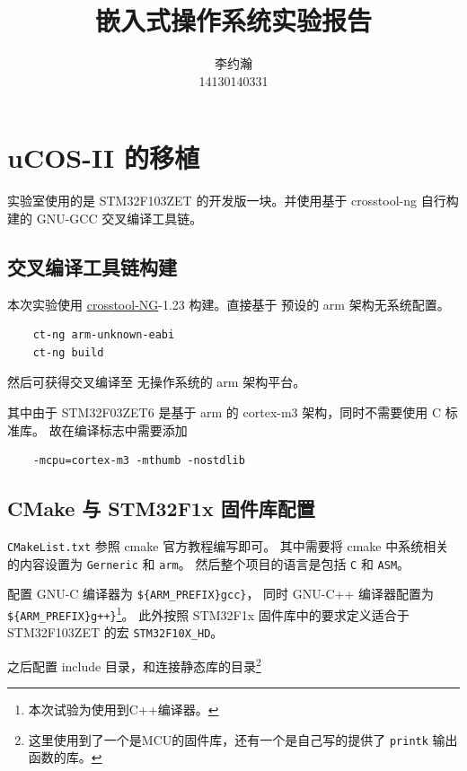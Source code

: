 \documentclass{ctexart}
\title{嵌入式操作系统实验报告}
\author{李约瀚 \\ 14130140331}
\begin{document}
    \maketitle
    \newpage
    \tableofcontents
    \newpage
    
    \section{uCOS-II 的移植}
    \label{sec:ucosii-transplate}
    
    实验室使用的是 STM32F103ZET 的开发版一块。并使用基于 crosstool-ng 自行构建的 GNU-GCC
    交叉编译工具链。
    
    \subsection{交叉编译工具链构建}
    \label{sec:ucosii-transplate:crosstool-chain}
    
    本次实验使用 \href{http://crosstool-ng.github.io/}{crosstool-NG}-1.23 构建。直接基于
    预设的 arm 架构无系统配置。
    \begin{lstlisting}
    ct-ng arm-unknown-eabi
    ct-ng build
    \end{lstlisting}
    然后可获得交叉编译至 无操作系统的 arm 架构平台。
    
    其中由于 STM32F03ZET6 是基于 arm 的 cortex-m3 架构，同时不需要使用 C 标准库。
    故在编译标志中需要添加
    \begin{lstlisting}
    -mcpu=cortex-m3 -mthumb -nostdlib
    \end{lstlisting}
    
    \subsection{CMake 与 STM32F1x 固件库配置}
    \label{sec:ucosii-transplate:cmakeNstm32f1x}
    
    \lstinline|CMakeList.txt| 参照 cmake 官方教程编写即可。
    其中需要将 cmake 中系统相关的内容设置为 \verb|Gerneric| 和 \verb|arm|。
    然后整个项目的语言是包括 \verb|C| 和 \verb|ASM|。
    
    配置 GNU-C 编译器为 \lstinline|${ARM_PREFIX}gcc}|， 同时 GNU-C++ 编译器配置为 
    \lstinline|${ARM_PREFIX}g++}|\footnote{本次试验为使用到C++编译器。}。
    此外按照 STM32F1x 固件库中的要求定义适合于 STM32F103ZET 的宏 \lstinline|STM32F10X_HD|。
    
    之后配置 include 目录，和连接静态库的目录\footnote{这里使用到了一个是MCU的固件库，还有一个是自己写的提供了
    \lstinline|printk| 输出函数的库。}
    
\end{document}
